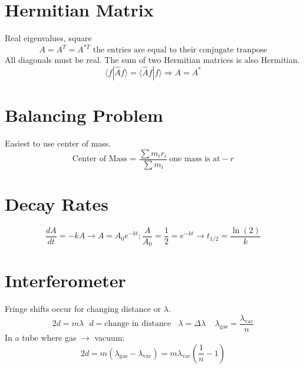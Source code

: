 \documentclass[10pt,a4paper]{article}
\begin{document}
\section{Hermitian Matrix} %
\label{sec:hermitian_matrix}
Real eigenvalues, square
\begin{equation}
    A = A^T = A^{*T} \textrm{ the entries are equal to their conjugate tranpose}
\end{equation}
All diagonals must be real. The sum of two Hermitian matrices is also Hermitian.
\begin{equation}
    \langle f | \hat{A} f \rangle = \langle \hat{A} f | f \rangle \Rightarrow A = A^*
\end{equation}

\section{Balancing Problem} %
\label{sec:balancing_problem}
Easiest to use center of mass. 
\begin{equation}
    \textrm{Center of Mass = } \frac{\sum m_i r_i}{\sum m_i}~ \textrm{one mass is at}-r
\end{equation}

\section{Decay Rates} %
\label{sec:decay_rates}
\begin{equation}
    \frac{dA}{dt}= -kA \rightarrow A = A_0e^{-kt}; \frac{A}{A_0} = \frac{1}{2}=e^{-kt} \rightarrow t_{1/2} = \frac{\ln(2)}{k}
\end{equation}

\section{Interferometer} %
\label{sec:interferometere}
Fringe shifts occur for changing distance or $\lambda$. 
\begin{equation}
    2d = m\lambda ~~~ d=\textrm{change in distance} ~~~~ \lambda  = \Delta \lambda ~~~~~ \lambda_{\textrm{gas}} = \frac{\lambda_{\textrm{vac}}}{n}
\end{equation}
In a tube where gas $\rightarrow$ vacuum: 
\begin{equation}
    2d = m (\lambda_{\textrm{gas}} - \lambda_{\textrm{vac}}) = m \lambda_{\textrm{vac}} \left( \frac{1}{n} -1  \right) 
\end{equation}
\end{document}
